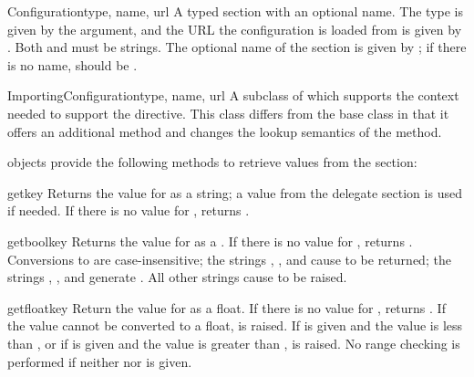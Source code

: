 \documentclass{howto}
\begin{document}
\begin{classdesc}{Configuration}{type, name, url}
  A typed section with an optional name.  The type is given by the
   argument, and the URL the configuration is loaded from is
  given by .  Both  and  must be strings.
  The optional name of the section is given by ; if there is
  no name,  should be .
\end{classdesc}

\begin{classdesc}{ImportingConfiguration}{type, name, url}
  A subclass of  which supports the context
  needed to support the  directive.  This class
  differs from the base class in that it offers an additional method
  and changes the lookup semantics of the  method.
\end{classdesc}

 objects provide the following methods to
retrieve values from the section:

\begin{methoddesc}[Configuration]{get}{key}
  Returns the value for  as a string; a value from the
  delegate section is used if needed.  If there is no value for
  , returns .
\end{methoddesc}

\begin{methoddesc}[Configuration]{getbool}{key}
  Returns the value for  as a .  If there is no
  value for , returns .  Conversions to
   are case-insensitive; the strings ,
  , and  cause  to be returned; the
  strings , , and  generate
  .  All other strings cause  to be
  raised.
\end{methoddesc}

\begin{methoddesc}[Configuration]{getfloat}{key}
  Return the value for  as a float.  If there is no
  value for , returns .  If the value cannot
  be converted to a float,  is raised.  If
   is given and the value is less than , or if
   is given and the value is greater than ,
   is raised.  No range checking is performed if
  neither  nor  is given.
\end{methoddesc}
\end{document}
